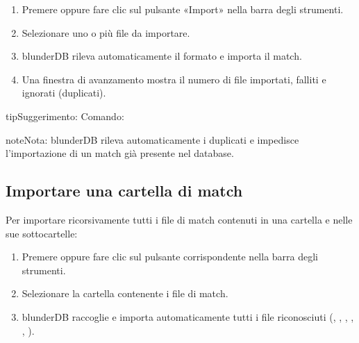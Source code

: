 \documentclass[letterpaper,10pt,italian]{sphinxmanual}
\begin{document}
\sphinxAtStartPar
{}
\begin{enumerate}
%
\item {} 
\sphinxAtStartPar
Premere  oppure fare clic sul pulsante «Import» nella barra degli strumenti.

\item {} 
\sphinxAtStartPar
Selezionare uno o più file da importare.

\item {} 
\sphinxAtStartPar
blunderDB rileva automaticamente il formato e importa il match.

\item {} 
\sphinxAtStartPar
Una finestra di avanzamento mostra il numero di file importati, falliti e ignorati (duplicati).

\end{enumerate}

\begin{sphinxadmonition}{tip}{Suggerimento:}
\sphinxAtStartPar
Comando: 
\end{sphinxadmonition}

\begin{sphinxadmonition}{note}{Nota:}
\sphinxAtStartPar
blunderDB rileva automaticamente i duplicati e impedisce l’importazione di un match già presente nel database.
\end{sphinxadmonition}


\subsection{Importare una cartella di match}
\label{\detokenize{guide_utilisateur:importer-un-dossier-de-matchs}}
\sphinxAtStartPar
Per importare ricorsivamente tutti i file di match contenuti in una cartella e nelle sue sottocartelle:
\begin{enumerate}
%
\item {} 
\sphinxAtStartPar
Premere  oppure fare clic sul pulsante corrispondente nella barra degli strumenti.

\item {} 
\sphinxAtStartPar
Selezionare la cartella contenente i file di match.

\item {} 
\sphinxAtStartPar
blunderDB raccoglie e importa automaticamente tutti i file riconosciuti (, , , , , ).

\end{enumerate}
\end{document}
